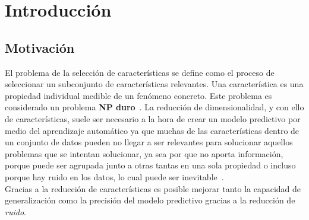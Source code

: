 \chapter{Introducción}
\section{Motivación}\label{motivation}
El problema de la selección de características se define como el proceso de
seleccionar un subconjunto de características relevantes. Una característica es
una propiedad individual medible de un fenómeno concreto. Este problema es
considerado un problema \textbf{NP duro}~\cite{leeuwen_algorithms_1998,johnjeffery_automata}. La reducción de dimensionalidad, y con
ello de características, suele ser necesario a la hora de crear un modelo predictivo por medio
del aprendizaje automático ya que muchas de las características
dentro de un conjunto de datos pueden no llegar a ser relevantes para solucionar
aquellos problemas que se intentan solucionar, ya sea por que no aporta información,
porque puede ser agrupada junto a otras tantas en una sola propiedad o incluso porque hay ruido
en los datos, lo cual puede ser inevitable~\cite{Mostafa2012}.\\[6pt]
Gracias a la reducción de características es posible mejorar tanto la capacidad de generalización
como la precisión del modelo predictivo gracias a la reducción de \textit{ruido}.\\[6pt]

